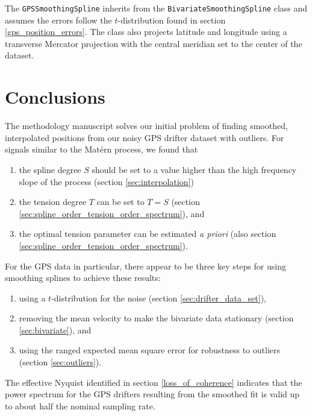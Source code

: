 \documentclass{ametsoc}
\begin{document}
The \texttt{GPSSmoothingSpline} inherits from the \texttt{BivariateSmoothingSpline} class and assumes the errors follow the $t$-distribution found in section \ref{gps_position_errors}. The class also projects latitude and longitude using a transverse Mercator projection with the central meridian set to the center of the dataset.

\section{Conclusions}

The methodology manuscript solves our initial problem of finding smoothed, interpolated positions from our noisy GPS drifter dataset with outliers. For signals similar to the Mat\'ern process, we found that
\begin{enumerate}
\item the spline degree $S$ should be set to a value higher than the high frequency slope of the process (section \ref{sec:interpolation})
\item the tension degree $T$ can be set to $T=S$ (section \ref{sec:spline_order_tension_order_spectrum}), and
\item the optimal tension parameter can be estimated \emph{a priori} (also section \ref{sec:spline_order_tension_order_spectrum}).
\end{enumerate}
For the GPS data in particular, there appear to be three key steps for using smoothing splines to achieve these results:
\begin{enumerate}
    \item using a $t$-distribution for the noise (section \ref{sec:drifter_data_set}),
    \item removing the mean velocity to make the bivariate data stationary (section \ref{sec:bivariate}), and
    \item using the ranged expected mean square error for robustness to outliers (section \ref{sec:outliers}).
\end{enumerate}
The effective Nyquist identified in section \ref{loss_of_coherence} indicates that the power spectrum for the GPS drifters resulting from the smoothed fit is valid up to about half the nominal sampling rate.
%
\appendix
%

\label{sec:numerical_implementation}
\end{document}
